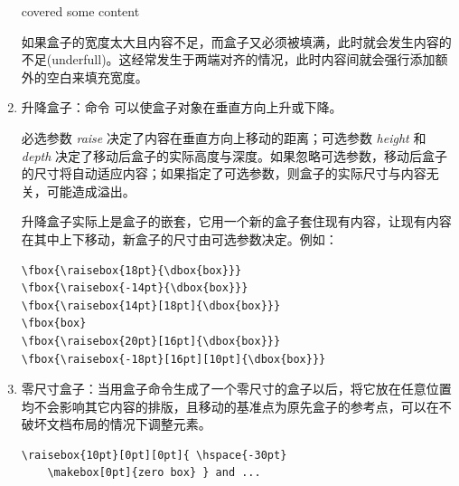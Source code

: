 \begin{enumerate}
\begin{tcolorbox}[sidebyside]
\tcblower
\raggedleft
{} covered some content
\end{tcolorbox}

如果盒子的宽度太大且内容不足，而盒子又必须被填满，此时就会发生内容的不足(underfull)。这经常发生于两端对齐的情况，此时内容间就会强行添加额外的空白来填充宽度。

\item 升降盒子：命令  可以使盒子对象在垂直方向上升或下降。

必选参数 {\ttfamily\itshape raise} 决定了内容在垂直方向上移动的距离；可选参数 {\ttfamily\itshape height} 和 {\ttfamily\itshape depth} 决定了移动后盒子的实际高度与深度。如果忽略可选参数，移动后盒子的尺寸将自动适应内容；如果指定了可选参数，则盒子的实际尺寸与内容无关，可能造成溢出。

升降盒子实际上是盒子的嵌套，它用一个新的盒子套住现有内容，让现有内容在其中上下移动，新盒子的尺寸由可选参数决定。例如：

\begin{tcolorbox}[sidebyside, righthand width=0.33\linewidth]
\begin{lstlisting}
\fbox{\raisebox{18pt}{\dbox{box}}}
\fbox{\raisebox{-14pt}{\dbox{box}}}
\fbox{\raisebox{14pt}[18pt]{\dbox{box}}}
\fbox{box}
\fbox{\raisebox{20pt}[16pt]{\dbox{box}}}
\fbox{\raisebox{-18pt}[16pt][10pt]{\dbox{box}}}
\end{lstlisting}

\tcblower
\fboxrule=0.2pt \fboxsep=0pt
\Large

\end{tcolorbox}

\item 零尺寸盒子：当用盒子命令生成了一个零尺寸的盒子以后，将它放在任意位置均不会影响其它内容的排版，且移动的基准点为原先盒子的参考点，可以在不破坏文档布局的情况下调整元素。

\begin{tcolorbox}[sidebyside, righthand width=0.4\linewidth]
\begin{lstlisting}
\raisebox{10pt}[0pt][0pt]{ \hspace{-30pt} 
    \makebox[0pt]{zero box} } and ...
\end{lstlisting} 


\end{tcolorbox}
\end{enumerate}
